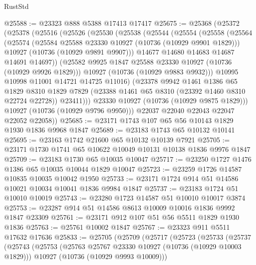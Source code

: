 \begin{lexlean}{RustStd}
\begin{coremodule}
@25588 := @23323 @888 @5388 @17413 @17417
@25675 := @25368
    (@25372
      (@25378
        (@25516
          (@25526
            (@25530
              (@25538
                (@25544
                  (@25554
                    (@25558
                      (@25564
                        (@25574
                          (@25584 @25588 @23330 @10927 (@10736 (@10929 @9901 @1829)))
                          @10927
                          (@10736 (@10929 @9891 @9907)))
                        @14677
                        @14680
                        @14683
                        @14687
                        @14691
                        @14697))
                    (@25582 @9925 @1847 @25588 @23330 @10927 (@10736 (@10929 @9926 @1829)))
                    @10927
                    (@10736 (@10929 @9883 @9932)))
                  @10995
                  @10998
                  @11001
                  @14721
                  @14725
                  @11016)
                (@23378
                  @9942
                  @1461
                  @1386
                  @65
                  @1829
                  @8310
                  @1829
                  @7829
                  (@23388 @1461 @65 @8310 (@23392 @1460 @8310 @22724 @22728))
                  @23411)))
            @23330
            @10927
            (@10736 (@10929 @9875 @1829)))
          @10927
          (@10736 (@10929 @9796 @9950)))
        @22037
        @22040
        @22043
        @22047
        @22052
        @22058))
@25685 := @23171 @1743 @107 @65 @56 @10143 @1829 @1930 @1836 @9968 @1847
@25689 := @23183 @1743 @65 @10132 @10141
@25695 := @23163 @1742 @21600 @65 @10132 @10139 @7921
@25705 := @23171 @1730 @1741 @65 @10622 @10049 @10131 @10138 @1836 @9976 @1847
@25709 := @23183 @1730 @65 @10035 @10047
@25717 := @23250 @1727 @1476 @1386 @65 @10035 @10044 @1829 @10047
@25723 := @23259 @1726 @14587 @10835 @10035 @10042 @1950
@25733 := @23171 @1724 @914 @51 @14586 @10021 @10034 @10041 @1836 @9984 @1847
@25737 := @23183 @1724 @51 @10010 @10019
@25743 := @23280 @1723 @14587 @51 @10010 @10017 @3874
@25753 := @23287 @914 @51 @14586 @8613 @10009 @10016 @1836 @9992 @1847 @23309
@25761 := @23171 @912 @107 @51 @56 @5511 @1829 @1930 @1836
@25763 := @25761 @10002 @1847
@25767 := @23323 @911 @5511 @17632 @17636
@25833 := @25705
    (@25709
      (@25717
        (@25723
          (@25733
            (@25737
              (@25743
                (@25753
                  (@25763 @25767 @23330 @10927 (@10736 (@10929 @10003 @1829)))
                  @10927
                  (@10736 (@10929 @9993 @10009)))

\end{coremodule}
\end{lexlean}

